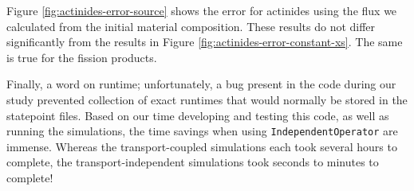     Figure \ref{fig:actinides-error-source} shows the error for actinides using
    the flux we calculated from the initial material composition. These results
    do not differ significantly from the results in Figure
    \ref{fig:actinides-error-constant-xs}. The same is true for the fission
    products.

    Finally, a word on runtime; unfortunately, a bug present in the code during
    our study prevented collection of exact runtimes that would normally be
    stored in the statepoint files. Based on our time developing and testing
    this code, as well as running the simulations, the time savings when using
    \verb.IndependentOperator. are immense. Whereas the transport-coupled
    simulations each took several hours to complete, the transport-independent
    simulations took seconds to minutes to complete!


